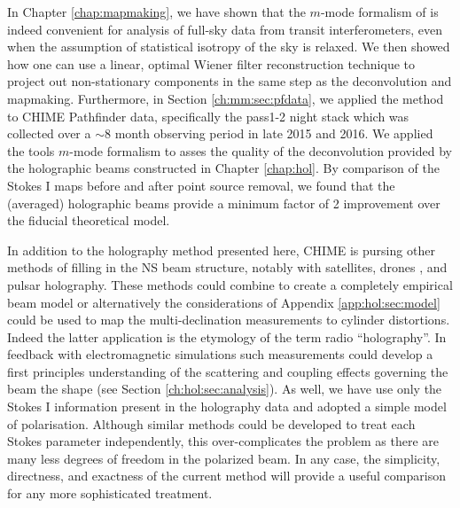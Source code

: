 In Chapter \ref{chap:mapmaking}, we have shown that the $m$-mode formalism of \cite{mmodes1, mmodes2} is indeed convenient for analysis of full-sky data from transit interferometers, even when the assumption of statistical isotropy of the sky is relaxed. We then showed how one can use a linear, optimal Wiener filter reconstruction technique to project out non-stationary components in the same step as the deconvolution and mapmaking. Furthermore, in Section \ref{ch:mm:sec:pfdata}, we applied the method to CHIME Pathfinder data, specifically the pass1-2 night stack which was collected over a $\sim$8 month observing period in late 2015 and 2016. We applied the tools $m$-mode formalism to asses the quality of the deconvolution provided by the holographic beams constructed in Chapter \ref{chap:hol}. By comparison of the Stokes I maps before and after point source removal, we found that the (averaged) holographic beams provide a minimum factor of 2 improvement over the fiducial theoretical model.

In addition to the holography method presented here, CHIME is pursing other methods of filling in the NS beam structure, notably with satellites\citep{hol2, sat2}, drones \citep{drone}, and pulsar holography. These methods could combine to create a completely empirical beam model or alternatively the considerations of Appendix \ref{app:hol:sec:model} could be used to map the multi-declination measurements to cylinder distortions. Indeed the latter application is the etymology of the term radio ``holography''. In feedback with electromagnetic simulations such measurements could develop a first principles understanding of the scattering and coupling effects governing the beam the shape (see Section \ref{ch:hol:sec:analysis}). As well, we have use only the Stokes I information present in the holography data and adopted a simple model of polarisation. Although similar methods could be developed to treat each Stokes parameter independently, this over-complicates the problem as there are many less degrees of freedom in the polarized beam\citep{holpol}. In any case, the simplicity, directness, and exactness of the current method will provide a useful comparison for any more sophisticated treatment.

